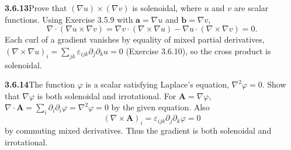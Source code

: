 
\par\bigskip
\noindent\textbf{3.6.13}\quad Prove that $(\nabla u)\times(\nabla v)$ is
solenoidal, where $u$ and $v$ are  scalar functions.
\solution
{}
Using Exercise 3.5.9 with $\mathbf a=\nabla u$ and $\mathbf b=\nabla v$,
\[
\nabla\cdot(\nabla u\times\nabla v)
=\nabla v\cdot(\nabla\times\nabla u)
-\nabla u\cdot(\nabla\times\nabla v)=0.
\]
Each curl of a gradient vanishes by equality of mixed partial
derivatives, $(\nabla\times\nabla u)_i=\sum_{jk}\varepsilon_{ijk}
\partial_j\partial_ku=0$ (Exercise 3.6.10), so the cross product is
solenoidal.

\par\bigskip
\noindent\textbf{3.6.14}\quad The function $\varphi$ is a scalar satisfying
Laplace's equation, $\nabla^{2}\varphi=0$. Show that $\nabla\varphi$ is both
solenoidal and irrotational.
\solution
For $\mathbf A=\nabla\varphi$,
$\nabla\cdot\mathbf A=\sum_i\partial_i\partial_i\varphi
=\nabla^2\varphi=0$ by the given equation.
Also
\[
(\nabla\times\mathbf A)_i
=\varepsilon_{ijk}\partial_j\partial_k\varphi=0
\]
by commuting mixed derivatives. Thus the gradient is both solenoidal
and irrotational.

